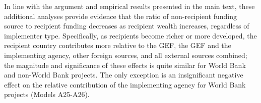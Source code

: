 \documentclass{article}
\begin{document}
In line with the argument and empirical results presented in the main text, these additional analyses provide evidence that the ratio of non-recipient funding source to recipient funding decreases as recipient wealth increases, regardless of implementer type.  Specifically, as recipients become richer or more developed, the recipient country contributes more relative to the GEF, the GEF and the implementing agency, other foreign sources, and all external sources combined; the magnitude and significance of these effects is quite similar for World Bank and non-World Bank projects.  The only exception is an insignificant negative effect on the relative contribution of the implementing agency for World Bank projects (Models A25-A26). 	

\begin{singlespace}
	\begin{landscape}
		\begin{table}[H]
			\centering
			\caption{Effect of Recipient Wealth on Log-Ratio Measures of Bargaining Outcome}
			\label{tab:TA6}
\end{table}
\end{landscape}
\end{singlespace}
\end{document}
